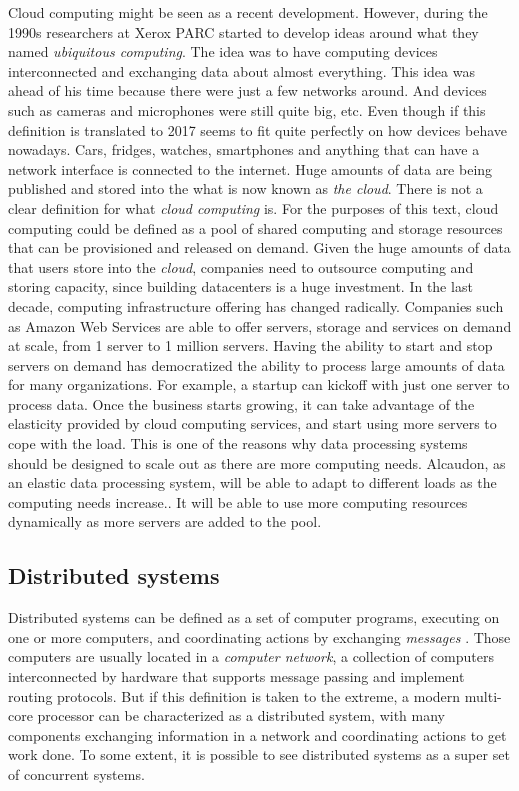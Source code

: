 Cloud computing might be seen as a recent development. However, during the 1990s
researchers at Xerox PARC started to develop ideas around what they named
\textit{ubiquitous computing}. The idea was to have computing devices
interconnected and exchanging data about almost everything. This idea was ahead
of his time because there were just a few networks around. And devices such as
cameras and microphones were still quite big, etc. Even though if this definition is
translated to 2017 seems to fit quite perfectly on how devices behave nowadays.
Cars, fridges, watches, smartphones and anything that can have a network
interface is connected to the internet. Huge amounts of data are being published
and stored into the what is now known as \textit{the cloud}. There is not a
clear definition for what \textit{cloud computing} is. For the purposes of this
text, cloud computing could be defined as a pool of shared computing and storage
resources that can be provisioned and released on demand. Given the huge amounts
of data that users store into the \textit{cloud}, companies need to outsource
computing and storing capacity, since building datacenters is a huge investment.
In the last decade, computing infrastructure offering has changed radically.
Companies such as Amazon Web Services are able to offer servers, storage and
services on demand at scale, from 1 server to 1 million servers. Having the
ability to start and stop servers on demand has democratized the ability to
process large amounts of data for many organizations. For example, a startup can
kickoff with just one server to process data. Once the business starts growing,
it can take advantage of the elasticity provided by cloud computing services,
and start using more servers to cope with the load. This is one of the reasons why
data processing systems should be designed to scale out as there are more
computing needs.
Alcaudon, as an elastic data processing system, will be able to adapt to
different loads as the computing needs increase.. It will be able to use more
computing resources dynamically as more servers are added to the pool.

\subsection{Distributed systems}
\label{subsection:distsys}

Distributed systems can be defined as a set of computer programs, executing on
one or more computers, and coordinating actions by exchanging \textit{messages}
\cite{GuideReliable}. Those computers are usually located in a \textit{computer
  network}, a collection of computers interconnected by hardware that supports
message passing and implement routing protocols. But if this definition is taken
to the extreme, a modern multi-core processor can be characterized as a
distributed system, with many components exchanging information in a network and
coordinating actions to get work done. To some extent, it is possible to see
distributed systems as a super set of concurrent systems.

